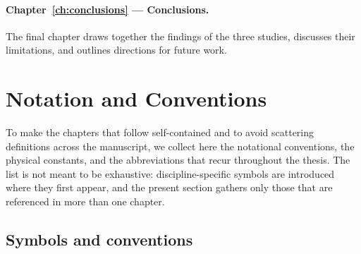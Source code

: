 \paragraph{Chapter~\ref{ch:conclusions} --- Conclusions.}
The final chapter draws together the findings of the three studies,
discusses their limitations, and outlines directions for future work.

\section{Notation and Conventions}
\label{sec:notation}

To make the chapters that follow self-contained and to avoid scattering
definitions across the manuscript, we collect here the notational
conventions, the physical constants, and the abbreviations that recur
throughout the thesis.  The list is not meant to be exhaustive:
discipline-specific symbols are introduced where they first appear,
and the present section gathers only those that are referenced in more
than one chapter.

\subsection*{Symbols and conventions}

